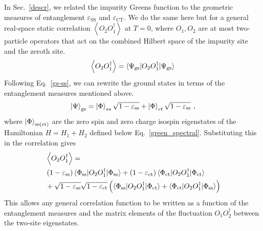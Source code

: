 \documentclass[reprint,superscriptaddress,floatfix]{revtex4-2}
\begin{document}
In Sec.~\ref{descr}, we related the impurity Greens function to the geometric measures of entanglement \(\varepsilon_\text{SS}\) and \(\varepsilon_\text{CT}\). We do the same here but for a general real-space static correlation \(\left< O_2 O_1^\dagger\right>\) at \(T=0\), where \(O_1, O_2\) are at most two-particle operators that act on the combined Hilbert space of the impurity site and the zeroth site.
\begin{equation}\begin{aligned}
	\left<O_2 O_1^\dagger\right> = \braket{\Psi_\text{gs} | O_2 O_1^\dagger | \Psi_\text{gs}}
\end{aligned}\end{equation}
Following Eq.~\ref{gs-ss}, we can rewrite the ground states in terms of the entanglement measures mentioned above.
\begin{equation}\begin{aligned}
	\ket{\Psi}_\text{gs} = \ket{\Phi}_{ss}\sqrt{1 - \varepsilon_\text{ss}} + \ket{\Phi}_{ct}\sqrt{1 - \varepsilon_\text{ss}}~,
\end{aligned}\end{equation}
where \(\ket{\Phi}_\text{ss(ct)}\) are the zero spin and zero charge isospin eigenstates of the Hamiltonian \(H = H_1 + H_2\) defined below Eq.~\ref{green_spectral}.
Substituting this in the correlation gives
\begin{equation}\begin{aligned}
	\label{gen-entng}
	&\left<O_2 O_1^\dagger\right> =\\
	&\left(1 - \varepsilon_\text{ss}\right) \braket{\Phi_\text{ss} | O_2 O_1^\dagger | \Phi_\text{ss}} + \left(1 - \varepsilon_\text{ct}\right) \braket{\Phi_\text{ct} | O_2 O_1^\dagger | \Phi_\text{ct}}\\
	&+ \sqrt{1 - \varepsilon_\text{ss}}\sqrt{1 - \varepsilon_\text{ct}}\left(\braket{\Phi_\text{ss} | O_2 O_1^\dagger | \Phi_\text{ct}} + \braket{\Phi_\text{ct} | O_2 O_1^\dagger | \Phi_\text{ss}}\right)
\end{aligned}\end{equation}
This allows any general correlation function to be written as a function of the entanglement measures and the matrix elements of the fluctuation \(O_1 O_2^\dagger\) between the two-site eigenstates.
\end{document}

